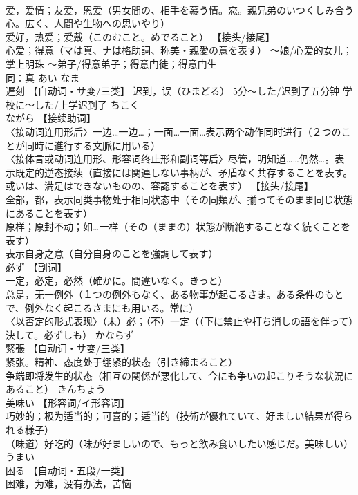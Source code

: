 \documentclass[8pt]{extreport}
\begin{document}
\begin{CJK}{UTF8}{min}
\\	爱，爱情；友爱，恩爱（男女間の、相手を慕う情。恋。親兄弟のいつくしみ合う心。広く、人間や生物への思いやり） 
\\	爱好，热爱；爱戴（このむこと。めでること） 【接头/接尾】 
\\	心爱；得意（マは真、ナは格助詞、称美・親愛の意を表す） ～娘/心爱的女儿；掌上明珠 ～弟子/得意弟子；得意门徒；得意门生 
\\	同：真	あい なま	
\\	遅刻	【自动词・サ变/三类】 迟到，误（ひまどる） 5分～した/迟到了五分钟 学校に～した/上学迟到了	ちこく	
\\	ながら	【接续助词】 
\\	〈接动词连用形后〉一边…一边…；一面…一面…表示两个动作同时进行（２つのことが同時に進行する文脈に用いる） 
\\	〈接体言或动词连用形、形容词终止形和副词等后〉尽管，明知道……仍然…。表示既定的逆态接续（直接には関連しない事柄が、矛盾なく共存することを表す。或いは、満足はできないものの、容認することを表す） 【接头/接尾】 
\\	全部，都，表示同类事物处于相同状态中（その同類が、揃ってそのまま同じ状態にあることを表す） 
\\	原样；原封不动；如…一样（その（ままの）状態が断絶することなく続くことを表す） 
\\	表示自身之意（自分自身のことを強調して表す）		
\\	必ず	【副词】 
\\	一定，必定，必然（確かに。間違いなく。きっと） 
\\	总是，无一例外（１つの例外もなく、ある物事が起こるさま。ある条件のもとで、例外なく起こるさまにも用いる。常に） 
\\	〈以否定的形式表现〉（未）必；（不）一定（（下に禁止や打ち消しの語を伴って）決して。必ずしも）	かならず	
\\	緊張	【自动词・サ变/三类】 
\\	紧张。精神、态度处于绷紧的状态（引き締まること） 
\\	争端即将发生的状态（相互の関係が悪化して、今にも争いの起こりそうな状況にあること）	きんちょう	
\\	美味い	【形容词/イ形容词】 
\\	巧妙的；极为适当的；可喜的；适当的（技術が優れていて、好ましい結果が得られる様子） 
\\	（味道）好吃的（味が好ましいので、もっと飲み食いしたい感じだ。美味しい）	うまい	
\\	困る	【自动词・五段/一类】 
\\	困难，为难，没有办法，苦恼 

\end{CJK}
\end{document}
